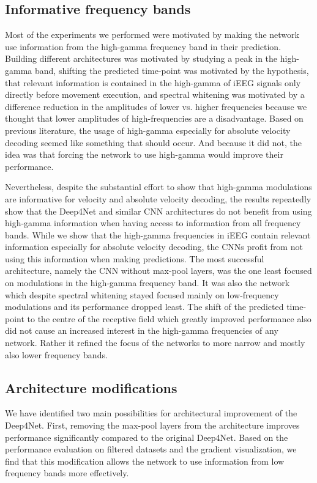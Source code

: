 \subsection*{Informative frequency bands}
Most of the experiments we performed were motivated by making the network use information from the high-gamma frequency band in their prediction.
Building different architectures was motivated by studying a peak in the high-gamma band, shifting the predicted time-point was motivated by the hypothesis, that relevant information is contained in the high-gamma of iEEG signals only directly before movement execution, and spectral whitening was motivated by a difference reduction in the amplitudes of lower vs. higher frequencies because we thought that lower amplitudes of high-frequencies are a disadvantage.
Based on previous literature, the usage of high-gamma especially for absolute velocity decoding seemed like something that should occur.
And because it did not, the idea was that forcing the network to use high-gamma would improve their performance.

Nevertheless, despite the substantial effort to show that high-gamma modulations are informative for velocity and absolute velocity decoding, the results repeatedly show that the Deep4Net and similar CNN architectures do not benefit from using high-gamma information when having access to information from all frequency bands.
While we show that the high-gamma frequencies in iEEG contain relevant information especially for absolute velocity decoding, the CNNs profit from not using this information when making predictions.
The most successful architecture, namely the CNN without max-pool layers, was the one least focused on modulations in the high-gamma frequency band.
It was also the network which despite spectral whitening stayed focused mainly on low-frequency modulations and its performance dropped least.
The shift of the predicted time-point to the centre of the receptive field which greatly improved performance also did not cause an increased interest in the high-gamma frequencies of any network.
Rather it refined the focus of the networks to more narrow and mostly also lower frequency bands.

\subsection*{Architecture modifications}
We have identified two main possibilities for architectural improvement of the Deep4Net. 
First, removing the max-pool layers from the architecture improves performance significantly compared to the original Deep4Net. 
Based on the performance evaluation on filtered datasets and the gradient visualization, we find that this modification allows the network to use information from low frequency bands more effectively. 

